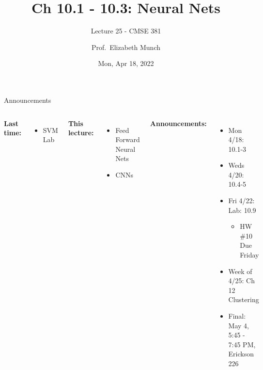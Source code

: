 \documentclass[aspectratio=169,usenames,dvipsnames]{beamer}
\begin{document}
\title[]{Ch 10.1 - 10.3: Neural Nets}
\subtitle{Lecture 25 - CMSE 381}
\date{Mon, Apr 18, 2022}



\author[Dr.~Munch]{Prof.~Elizabeth Munch}

\begin{frame}
 \titlepage


\end{frame}
\begin{frame}[c]{Announcements }

\begin{columns}
\centering

	\textbf{Last time:}
	\begin{itemize}
	\item SVM Lab
	\end{itemize}

	\vspace{.2in}

	\textbf{This lecture:}
	\begin{itemize}
		\item Feed Forward Neural Nets
		\item CNNs
\end{itemize}


\centering

\textbf{Announcements:}
	\begin{itemize}
	\item Mon 4/18: 10.1-3
	\item Weds 4/20: 10.4-5
	\item Fri 4/22: Lab: 10.9
	\begin{itemize}
		\item HW \#10 Due Friday
	\end{itemize}
	\item Week of 4/25: Ch 12 Clustering
	\item Final: May 4, 5:45 - 7:45 PM, Erickson 226

	\end{itemize}
\end{columns}

\end{frame}
\end{document}
